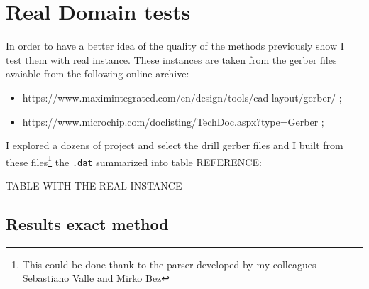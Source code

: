 \section{Real Domain tests}
\label{sec:realDomainTests}

	In order to have a better idea of the quality of the methods previously show I test them with real instance. These instances are taken from the gerber files avaiable from the following online archive:
	\begin{itemize}
		\item https://www.maximintegrated.com/en/design/tools/cad-layout/gerber/ ;
		\item https://www.microchip.com/doclisting/TechDoc.aspx?type=Gerber ;
	\end{itemize}

	I explored a dozens of project and select the drill gerber files and I built from these files\footnote{This could be done thank to the parser developed by my colleagues Sebastiano Valle and Mirko Bez} the \verb|.dat| summarized into table REFERENCE:
	
	TABLE WITH THE REAL INSTANCE
	
	\subsection{Results exact method}